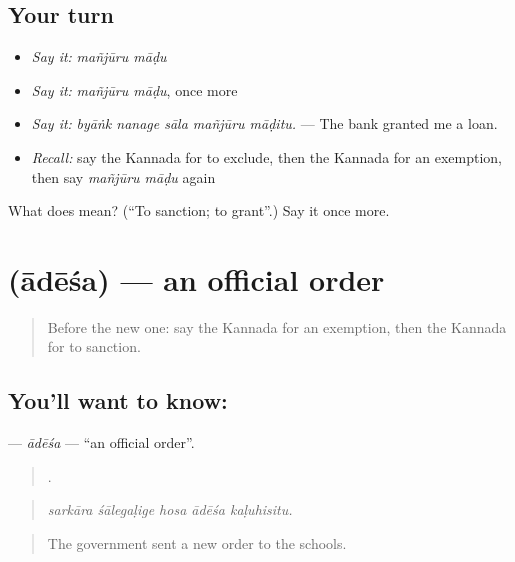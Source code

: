 \subsection*{Your turn}
\begin{itemize}
\raggedright
  \item \emph{Say it:} \emph{mañjūru māḍu}
  \item \emph{Say it:} \emph{mañjūru māḍu}, once more
  \item \emph{Say it:} \emph{byāṅk nanage sāla mañjūru māḍitu.} — The bank granted me a loan.
  \item \emph{Recall:} say the Kannada for to exclude, then the Kannada for an exemption, then say \emph{mañjūru māḍu} again
\end{itemize}

\begin{tcolorbox}[breakable,colback=teal!4,colframe=teal!35!black,title={Before you move on}]
What does   mean? (\textquotedblleft{}To sanction; to grant\textquotedblright{}.) Say it once more.
\end{tcolorbox}
\section[\texorpdfstring{\kn{ಆದೇಶ} (ādēśa)}{ಆದೇಶ (ādēśa)}]{ (ādēśa) — an official order}

\label{lesson:KA-C415-adesa}



\begin{quote}
Before the new one: say the Kannada for an exemption, then the Kannada for to sanction.
\end{quote}

\subsection*{You'll want to know: }
\textbf{} — \emph{ādēśa} — \textquotedblleft{}an official order\textquotedblright{}.

\begin{quote}
    .
\end{quote}

\begin{quote}
\emph{sarkāra śālegaḷige hosa ādēśa kaḷuhisitu.}
\end{quote}

\begin{quote}
The government sent a new order to the schools.
\end{quote}

